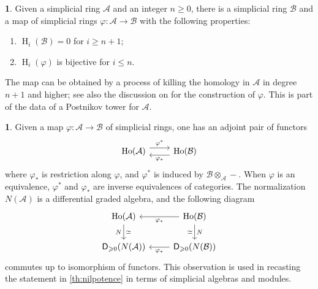\documentclass{amsart}
\newcommand{\vp}{{\varphi}}
\newcommand{\cat}[1]{{\mathsf{#1}}}
\newcommand{\hh}{\operatorname{H}}
\theoremstyle{definition}
\newtheorem{chunk}[subsection]{}
\theoremstyle{remark}
\numberwithin{equation}{subsection}
\begin{document}
\begin{chunk} 
\label{ch:postnikov}
Given a simplicial ring $\mathcal A$ and an integer $n\ge 0$, there is a simplicial ring $\mathcal B$ and a map of simplicial rings $\varphi \colon \mathcal A\to \mathcal B$ with the following properties:
\begin{enumerate}[\quad\rm(1)]
 \item 
 $\hh_i(\mathcal B)=0$ for $i\ge n+1$;
 \item
 $\hh_i(\varphi)$ is bijective for $i\le n$.
\end{enumerate}
The map can be obtained by a process of killing the homology in $\mathcal A$ in degree $n+1$ and higher; see also the discussion on \cite[pp.~162]{Toen:2010} for the construction of $\varphi$. This is part of the data of a Postnikov tower for $\mathcal A$.
\end{chunk}

\begin{chunk}
\label{ch:change-of-rings}
 Given a map $\vp\colon \mathcal A\to \mathcal B$ of simplicial rings, one has an adjoint pair of functors
\[
\begin{tikzcd}
\mathrm{Ho}(\mathcal A) \ar[r, shift left=1ex, "\vp^*" ] 
 & \mathrm{Ho}(\mathcal B) \ar[l, shift left = 1ex, "\vp_*" ]
\end{tikzcd}
\]
where $\vp_*$ is restriction along $\vp$, and $\vp^*$ is induced by $\mathcal B\otimes_{\mathcal A}-$. When $\vp$ is an equivalence, $\vp^*$ and $\vp_*$ are inverse equivalences of categories. The normalization $N(\mathcal A)$ is a differential graded algebra, and the following diagram 
\[
\begin{tikzcd}
 \mathrm{Ho}(\mathcal A) \ar[d, "\simeq", "N" swap] 
 & \mathrm{Ho}(\mathcal B) \ar[l, "\vp_*" ] \ar[d, "N", "\simeq" swap] \\
 \cat{D}_{\geqslant 0}(N(\mathcal A)) & \cat{D}_{\geqslant 0}(N(\mathcal B)) \ar[l, "\vp_*" ]
\end{tikzcd}
\]
commutes up to isomorphism of functors. This observation is used in recasting the statement in \cref{th:nilpotence} in terms of simplicial algebras and modules.
\end{chunk}
\end{document}
